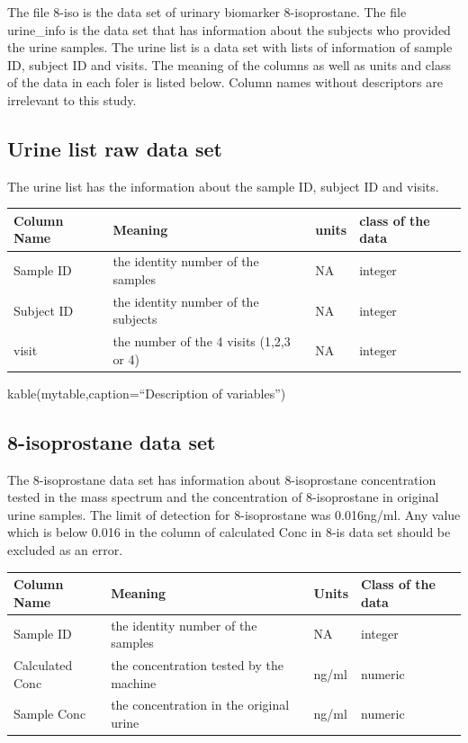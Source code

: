 \documentclass[12pt,]{article}
\begin{document}
The file 8-iso is the data set of urinary biomarker 8-isoprostane. The
file urine\_info is the data set that has information about the subjects
who provided the urine samples. The urine list is a data set with lists
of information of sample ID, subject ID and visits. The meaning of the
columns as well as units and class of the data in each foler is listed
below. Column names without descriptors are irrelevant to this study.

\hypertarget{urine-list-raw-data-set}{%
\subsection{Urine list raw data set}\label{urine-list-raw-data-set}}

The urine list has the information about the sample ID, subject ID and
visits.

\begin{longtable}[]{@{}llll@{}}
\toprule
Column Name & Meaning & units & class of the data\tabularnewline
\midrule
\endhead
Sample ID & the identity number of the samples & NA &
integer\tabularnewline
Subject ID & the identity number of the subjects & NA &
integer\tabularnewline
visit & the number of the 4 visits (1,2,3 or 4) & NA &
integer\tabularnewline
\bottomrule
\end{longtable}

kable(mytable,caption=``Description of variables'')

\hypertarget{isoprostane-data-set}{%
\subsection{8-isoprostane data set}\label{isoprostane-data-set}}

The 8-isoprostane data set has information about 8-isoprostane
concentration tested in the mass spectrum and the concentration of
8-isoprostane in original urine samples. The limit of detection for
8-isoprostane was 0.016ng/ml. Any value which is below 0.016 in the
column of calculated Conc in 8-is data set should be excluded as an
error.

\begin{longtable}[]{@{}llll@{}}
\toprule
Column Name & Meaning & Units & Class of the data\tabularnewline
\midrule
\endhead
Sample ID & the identity number of the samples & NA &
integer\tabularnewline
Calculated Conc & the concentration tested by the machine & ng/ml &
numeric\tabularnewline
Sample Conc & the concentration in the original urine & ng/ml &
numeric\tabularnewline
\bottomrule
\end{longtable}
\end{document}
